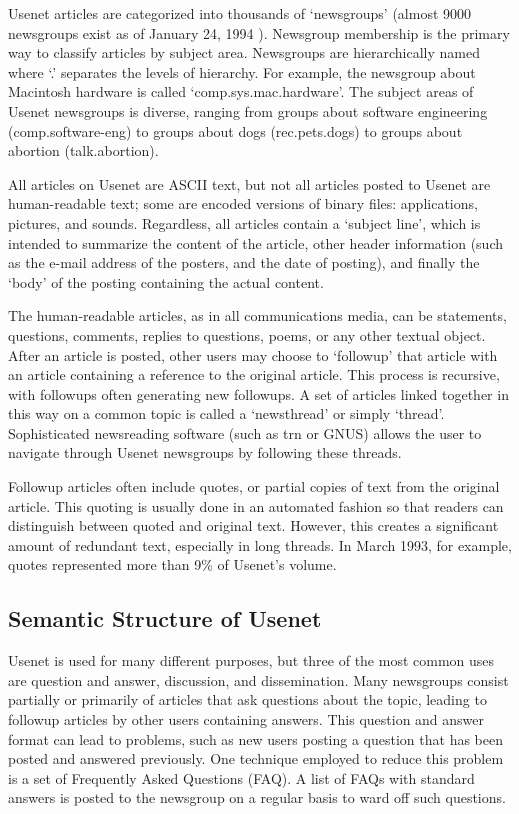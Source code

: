 Usenet articles are categorized into thousands of `newsgroups' (almost 9000
newsgroups exist as of January 24, 1994 \cite{uunet-usenet-94}). Newsgroup
membership is the primary way to classify articles by subject area.  Newsgroups
are hierarchically named where `.' separates the levels of hierarchy. For
example, the newsgroup about Macintosh hardware is called
`comp.sys.mac.hardware'. The subject areas of Usenet newsgroups is diverse,
ranging from groups about software engineering (comp.software-eng) to groups
about dogs (rec.pets.dogs) to groups about abortion (talk.abortion).

All articles on Usenet are ASCII text, but not all articles posted to
Usenet are human-readable text; some are encoded versions of binary files:
applications, pictures, and sounds. Regardless, all articles contain a `subject line', which is intended to summarize the content of the
article, other header information (such as the e-mail address of the
posters, and the date of posting), and finally the `body' of the
posting containing the actual content.

The human-readable articles, as in all communications media, can be statements,
questions, comments, replies to questions, poems, or any other textual object.
After an article is posted, other users may choose to `followup' that article
with an article containing a reference to the original article. This process is
recursive, with followups often generating new followups. A set of articles
linked together in this way on a common topic is called a `newsthread' or
simply `thread'. Sophisticated newsreading software (such as trn or GNUS)
allows the user to navigate through Usenet newsgroups by following these
threads.

Followup articles often include quotes, or partial copies of text from the
original article.  This quoting is usually done in an automated fashion so
that readers can distinguish between quoted and original text. However,
this creates a significant amount of redundant text, especially in long
threads.  In March 1993, for example, quotes represented more than 9\% of
Usenet's volume.

\subsection{Semantic Structure of Usenet}

Usenet is used for many different purposes, but three of the most common
uses are question and answer, discussion, and dissemination. Many
newsgroups consist partially or primarily of articles that ask questions
about the topic, leading to followup articles by other users containing
answers. This question and answer format can lead to problems, such as new
users posting a question that has been posted and answered previously.  One
technique employed to reduce this problem is a set of Frequently Asked
Questions (FAQ). A list of FAQs with standard answers is posted to the
newsgroup on a regular basis to ward off such questions. 

